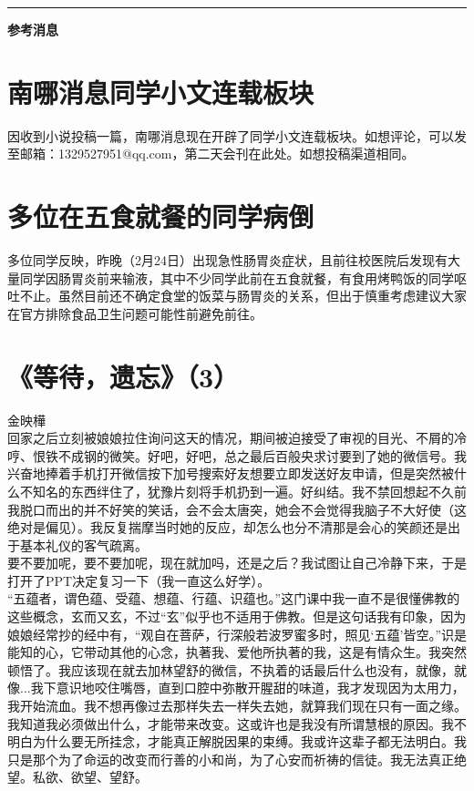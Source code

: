\documentclass[letterpaper, 12pt]{article}
\begin{document}
\hrule
\vspace{4mm}
\centerline{\huge\textbf{参考消息}}
\begin{multicols}{2}
\section{南哪消息同学小文连载板块}
因收到小说投稿一篇，南哪消息现在开辟了同学小文连载板块。如想评论，可以发至邮箱：1329527951@qq.com，第二天会刊在此处。如想投稿渠道相同。
\section{多位在五食就餐的同学病倒}
多位同学反映，昨晚（2月24日）出现急性肠胃炎症状，且前往校医院后发现有大量同学因肠胃炎前来输液，其中不少同学此前在五食就餐，有食用烤鸭饭的同学呕吐不止。虽然目前还不确定食堂的饭菜与肠胃炎的关系，但出于慎重考虑建议大家在官方排除食品卫生问题可能性前避免前往。
\section{《等待，遗忘》（3）}
金映樺\\
\newCJKfontfamily{}\fan
回家之后立刻被娘娘拉住询问这天的情况，期间被迫接受了审视的目光、不屑的冷哼、恨铁不成钢的微笑。好吧，好吧，总之最后百般央求讨要到了她的微信号。我兴奋地捧着手机打开微信按下加号搜索好友想要立即发送好友申请，但是突然被什么不知名的东西绊住了，犹豫片刻将手机扔到一遍。好纠结。我不禁回想起不久前我脱口而出的并不好笑的笑话，会不会太唐突，她会不会觉得我脑子不大好使（这绝对是偏见）。我反复揣摩当时她的反应，却怎么也分不清那是会心的笑颜还是出于基本礼仪的客气疏离。\\

要不要加呢，要不要加呢，现在就加吗，还是之后？我试图让自己冷静下来，于是打开了PPT决定复习一下（我一直这么好学）。\\

“五蕴者，谓色蕴、受蕴、想蕴、行蕴、识蕴也。”这门课中我一直不是很懂佛教的这些概念，玄而又玄，不过“玄”似乎也不适用于佛教。但是这句话我有印象，因为娘娘经常抄的经中有，“观自在菩萨，行深般若波罗蜜多时，照见‘五蕴’皆空。”识是能知的心，它带动其他的心念，执著我、爱他所执著的我，这是有情众生。我突然顿悟了。我应该现在就去加林望舒的微信，不执着的话最后什么也没有，就像，就像...我下意识地咬住嘴唇，直到口腔中弥散开腥甜的味道，我才发现因为太用力，我开始流血。我不想再像过去那样失去一样失去她，就算我们现在只有一面之缘。我知道我必须做出什么，才能带来改变。这或许也是我没有所谓慧根的原因。我不明白为什么要无所挂念，才能真正解脱因果的束缚。我或许这辈子都无法明白。我只是那个为了命运的改变而行善的小和尚，为了心安而祈祷的信徒。我无法真正绝望。私欲、欲望、望舒。\\


\end{multicols}
\end{document}
